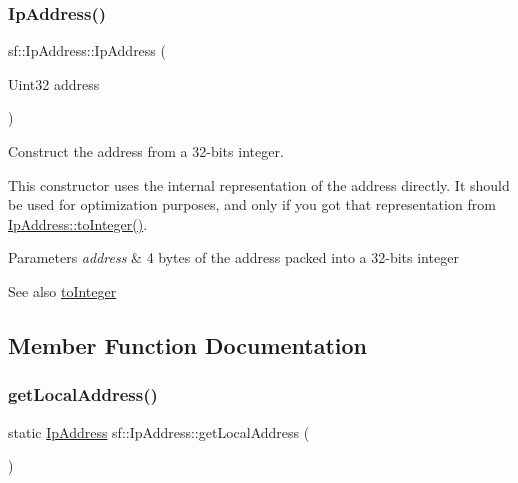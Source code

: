 \subsubsection{\texorpdfstring{Ip\+Address()}{IpAddress()}\hspace{0.1cm}{\footnotesize\ttfamily [5/5]}}
{\footnotesize\ttfamily sf\+::\+Ip\+Address\+::\+Ip\+Address (\begin{DoxyParamCaption}\item[{Uint32}]{address }\end{DoxyParamCaption})\hspace{0.3cm}{\ttfamily [explicit]}}



Construct the address from a 32-\/bits integer. 

This constructor uses the internal representation of the address directly. It should be used for optimization purposes, and only if you got that representation from \hyperlink{classsf_1_1_ip_address_ae7911c5ea9562f9602c3e29cd54b15e9}{Ip\+Address\+::to\+Integer()}.


\begin{DoxyParams}{Parameters}
{\em address} & 4 bytes of the address packed into a 32-\/bits integer\\
\hline
\end{DoxyParams}
\begin{DoxySeeAlso}{See also}
\hyperlink{classsf_1_1_ip_address_ae7911c5ea9562f9602c3e29cd54b15e9}{to\+Integer} 
\end{DoxySeeAlso}


\subsection{Member Function Documentation}
\mbox{\label{classsf_1_1_ip_address_a4c31622ad87edca48adbb8e8ed00ee4a}} 
\subsubsection{\texorpdfstring{get\+Local\+Address()}{getLocalAddress()}}
{\footnotesize\ttfamily static \hyperlink{classsf_1_1_ip_address}{Ip\+Address} sf\+::\+Ip\+Address\+::get\+Local\+Address (\begin{DoxyParamCaption}{ }\end{DoxyParamCaption})\hspace{0.3cm}{\ttfamily [static]}}



